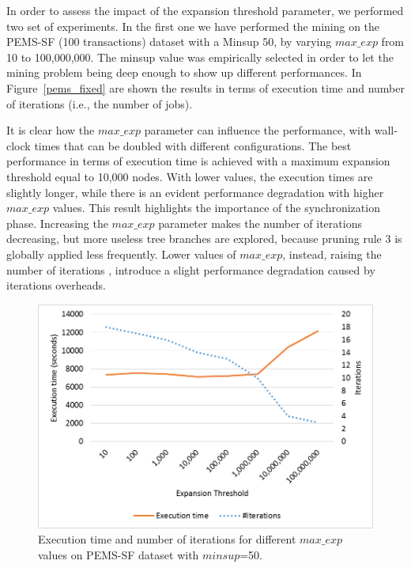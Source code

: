 In order to assess the impact of the expansion threshold parameter, we performed two set of experiments. In the first one we have performed the mining on the PEMS-SF (100 transactions) dataset with a Minsup 50, by varying $max\_exp$ from 10 to 100,000,000.  The minsup value was empirically selected in order to let the mining problem being deep enough to show up different performances. 
In Figure~\ref{pems_fixed} are shown the results in terms of execution time and number of iterations 
(i.e., the number of jobs).

It is clear how the $max\_exp$ parameter can influence the performance, with wall-clock times that can be doubled with different configurations. The best performance in terms of execution time is achieved with a maximum
expansion threshold equal to 10,000 nodes. With lower values, the execution times are slightly longer, while there is an evident performance degradation with higher $max\_exp$ values. 
This result highlights the importance of the synchronization phase.
Increasing the $max\_exp$ parameter makes the number of iterations decreasing,
but more useless tree branches are explored,
because pruning rule 3 is globally applied less frequently.
Lower values of  $max\_exp$, instead, raising the number of iterations
, introduce a slight performance
degradation caused by iterations overheads.

\begin{figure}[!t]
\includegraphics[width=5in]{immagini_extension/pems_fixed.png}
\caption{Execution time and number of iterations for different $max\_exp$ values on PEMS-SF dataset with $minsup$=50.
}
\label{breast_fixed}
\end{figure}

